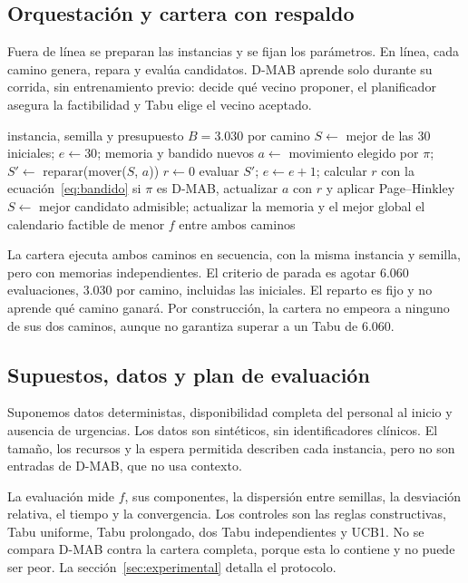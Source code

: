 \documentclass[12pt,letterpaper]{report}
\begin{document}
\subsection{Orquestación y cartera con respaldo}
Fuera de línea se preparan las instancias y se fijan los parámetros. En línea,
cada camino genera, repara y evalúa candidatos. D-MAB aprende solo durante su
corrida, sin entrenamiento previo: decide qué vecino proponer, el planificador
asegura la factibilidad y Tabu elige el vecino aceptado.

\begin{algorithm}[!ht]
\footnotesize
\caption{Cartera de Tabu uniforme y Tabu con D-MAB.}
\label{alg:cartera}
\begin{algorithmic}[1]
\Require instancia, semilla y presupuesto $B=3.030$ por camino
  \State $S\gets$ mejor de las 30 iniciales; $e\gets 30$; memoria y bandido nuevos
      \State $a\gets$ movimiento elegido por $\pi$; $S'\gets$ reparar(mover($S$, $a$))
       $r\gets 0$
      \Else{} evaluar $S'$; $e\gets e+1$; calcular $r$ con la ecuación~\eqref{eq:bandido}
      \EndIf
      \State si $\pi$ es D-MAB, actualizar $a$ con $r$ y aplicar Page--Hinkley
    \EndWhile
    \State $S\gets$ mejor candidato admisible; actualizar la memoria y el mejor global
  \EndWhile
\EndFor
\State \Return el calendario factible de menor $f$ entre ambos caminos
\end{algorithmic}
\end{algorithm}

La cartera ejecuta ambos caminos en secuencia, con la misma instancia y semilla,
pero con memorias independientes. El criterio de parada es agotar 6.060
evaluaciones, 3.030 por camino, incluidas las iniciales. El reparto es fijo y no
aprende qué camino ganará. Por construcción, la cartera no empeora a ninguno de
sus dos caminos, aunque no garantiza superar a un Tabu de 6.060.

\subsection{Supuestos, datos y plan de evaluación}
Suponemos datos deterministas, disponibilidad completa del personal al inicio y
ausencia de urgencias. Los datos son sintéticos, sin identificadores clínicos.
El tamaño, los recursos y la espera permitida describen cada instancia, pero no
son entradas de D-MAB, que no usa contexto.

La evaluación mide $f$, sus componentes, la dispersión entre semillas, la desviación
relativa, el tiempo y la convergencia. Los controles son las reglas constructivas,
Tabu uniforme, Tabu prolongado, dos Tabu independientes y UCB1. No se compara
D-MAB contra la cartera completa, porque esta lo contiene y no puede ser peor. La
sección~\ref{sec:experimental} detalla el protocolo.\label{pro-fin}

\clearpage


\clearpage


\clearpage


\clearpage
\printbibliography[title={Referencias}]
\end{document}
